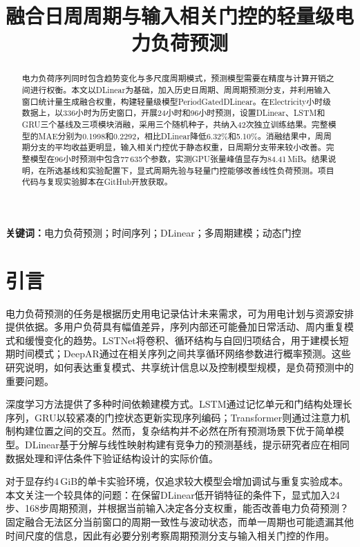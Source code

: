 \documentclass[UTF8,a4paper,zihao=5,fontset=windows]{ctexart}
\title{融合日周周期与输入相关门控的轻量级电力负荷预测}
\begin{document}
\maketitle
\begin{abstract}
电力负荷序列同时包含趋势变化与多尺度周期模式，预测模型需要在精度与计算开销之间进行权衡。本文以DLinear为基础，加入历史日周期、周周期预测分支，并利用输入窗口统计量生成融合权重，构建轻量级模型PeriodGatedDLinear。在Electricity小时级数据上，以336小时为历史窗口，开展24小时和96小时预测，设置DLinear、LSTM和GRU三个基线及三项模块消融，采用三个随机种子，共纳入42次独立训练结果。完整模型的MAE分别为0.1998和0.2292，相比DLinear降低6.32\%和5.10\%。消融结果中，周周期分支的平均收益更明显，输入相关门控优于静态权重，日周期分支带来较小改善。完整模型在96小时预测中包含77\,635个参数，实测GPU张量峰值显存为84.41\,MiB。结果说明，在所选基线和实验配置下，显式周期先验与轻量门控能够改善线性负荷预测。项目代码与复现实验脚本在GitHub开放获取。
\end{abstract}
\vspace{4pt}
\noindent\textbf{关键词：}电力负荷预测；时间序列；DLinear；多周期建模；动态门控

\section{引言}
电力负荷预测的任务是根据历史用电记录估计未来需求，可为用电计划与资源安排提供依据。多用户负荷具有幅值差异，序列内部还可能叠加日常活动、周内重复模式和缓慢变化的趋势。LSTNet将卷积、循环结构与自回归项结合，用于建模长短期时间模式\cite{lai2018lstnet}；DeepAR通过在相关序列之间共享循环网络参数进行概率预测\cite{salinas2017deepar}。这些研究说明，如何表达重复模式、共享统计信息以及控制模型规模，是负荷预测中的重要问题。

深度学习方法提供了多种时间依赖建模方式。LSTM通过记忆单元和门结构处理长序列\cite{hochreiter1997lstm}，GRU以较紧凑的门控状态更新实现序列编码\cite{cho2014gru}；Transformer则通过注意力机制构建位置之间的交互\cite{vaswani2017attention}。然而，复杂结构并不必然在所有预测场景下优于简单模型。DLinear基于分解与线性映射构建有竞争力的预测基线\cite{zeng2023dlinear}，提示研究者应在相同数据处理和评估条件下验证结构设计的实际价值。

对于显存约4\,GiB的单卡实验环境，仅追求较大模型会增加调试与重复实验成本。本文关注一个较具体的问题：在保留DLinear低开销特征的条件下，显式加入24步、168步周期预测，并根据当前输入决定各分支权重，能否改善电力负荷预测？固定融合无法区分当前窗口的周期一致性与波动状态，而单一周期也可能遗漏其他时间尺度的信息，因此有必要分别考察周期预测分支与输入相关门控的作用。
\end{document}
